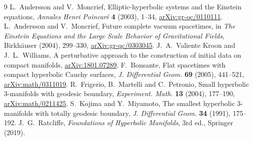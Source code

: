 \documentclass[11pt]{article}
\theoremstyle{remark}
\begin{document}
\begin{thebibliography}{9}
 L.~Andersson and V.~Moncrief,
Elliptic-hyperbolic systems and the Einstein equations,
\emph{Annales Henri Poincar\'e} \textbf{4} (2003), 1--34,
\href{https://arxiv.org/abs/gr-qc/0110111}{arXiv:gr-qc/0110111}.
 L.~Andersson and V.~Moncrief,
Future complete vacuum spacetimes,
in \emph{The Einstein Equations and the Large Scale Behavior of Gravitational Fields},
Birkh\"auser (2004), 299--330,
\href{https://arxiv.org/abs/gr-qc/0303045}{arXiv:gr-qc/0303045}.
 J.~A.~Valiente Kroon and J.~L.~Williams,
A perturbative approach to the construction of initial data on compact manifolds,
\href{https://arxiv.org/abs/1801.07289}{arXiv:1801.07289}.
 F.~Bonsante,
Flat spacetimes with compact hyperbolic Cauchy surfaces,
\emph{J. Differential Geom.} \textbf{69} (2005), 441--521,
\href{https://arxiv.org/abs/math/0311019}{arXiv:math/0311019}.
 R.~Frigerio, B.~Martelli and C.~Petronio,
Small hyperbolic \(3\)-manifolds with geodesic boundary,
\emph{Experiment. Math.} \textbf{13} (2004), 177--190,
\href{https://arxiv.org/abs/math/0211425}{arXiv:math/0211425}.
 S.~Kojima and Y.~Miyamoto,
The smallest hyperbolic \(3\)-manifolds with totally geodesic boundary,
\emph{J. Differential Geom.} \textbf{34} (1991), 175--192.
 J.~G.~Ratcliffe,
\emph{Foundations of Hyperbolic Manifolds}, 3rd ed., Springer (2019).
\end{thebibliography}
\end{document}
